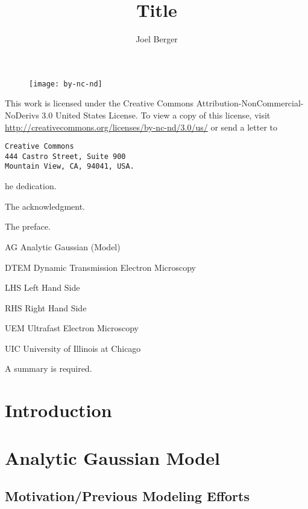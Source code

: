 \documentclass{uicthesi}
\title{Title}
\author{Joel Berger}
\begin{document}
\maketitle

\newpage
\begin{figure}
  \centering
  \texttt{[image: by-nc-nd]}
\end{figure}
This work is licensed under the Creative Commons Attribution-NonCommercial-NoDerivs 3.0 United States License.
To view a copy of this license, visit \url{http://creativecommons.org/licenses/by-nc-nd/3.0/us/} or send a letter to
\begin{verbatim}
Creative Commons
444 Castro Street, Suite 900
Mountain View, CA, 94041, USA.
\end{verbatim}


\dedication
The dedication.
 
\acknowledgment
The acknowledgment.
 
\preface
The preface.
 
\tableofcontents
\listoftables
\listoffigures
 
\listofabbreviations
\begin{list}
  {}
  {\setlength{\labelwidth}{1in}
   \setlength{\leftmargin}{1.5in}
   \setlength{\labelsep}{.5in}
   \setlength{\rightmargin}{\leftmargin}}

  \item[AG\hfill] Analytic Gaussian (Model)
  \item[DTEM\hfill] Dynamic Transmission Electron Microscopy
  \item[LHS\hfill] Left Hand Side
  \item[RHS\hfill] Right Hand Side
  \item[UEM\hfill] Ultrafast Electron Microscopy
  \item[UIC\hfill] University of Illinois at Chicago
\end{list}
 
\summary
A summary is required.

\chapter{Introduction}

\chapter{Analytic Gaussian Model}

\section{Motivation/Previous Modeling Efforts}
\end{document}

